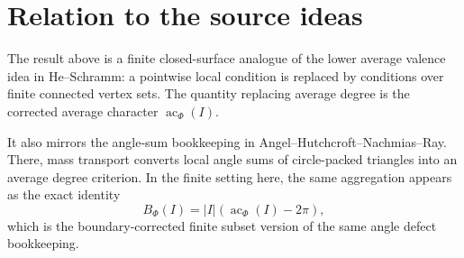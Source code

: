 \documentclass[11pt]{article}
\newcommand{\ac}{\operatorname{ac}}
\begin{document}
\section{Relation to the source ideas}

The result above is a finite closed-surface analogue of the lower average
valence idea in He--Schramm: a pointwise local condition is replaced by
conditions over finite connected vertex sets.  The quantity replacing
average degree is the corrected average character $\ac_\Phi(I)$.

It also mirrors the angle-sum bookkeeping in
Angel--Hutchcroft--Nachmias--Ray.  There, mass transport converts local
angle sums of circle-packed triangles into an average degree criterion.  In
the finite setting here, the same aggregation appears as the exact identity
\[
  B_\Phi(I)=|I|(\ac_\Phi(I)-2\pi),
\]
which is the boundary-corrected finite subset version of the same angle
defect bookkeeping.
\end{document}
